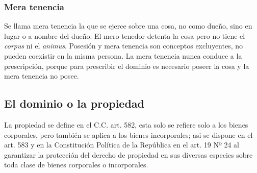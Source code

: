 \documentclass{templateNote}
\begin{document}
\subsubsection{Mera tenencia}
Se llama mera tenencia la que se ejerce sobre una cosa, no como dueño, sino en lugar o a nombre del dueño. El mero tenedor detenta la cosa pero no tiene el \textit{corpus} ni el \textit{animus}.
Posesión y mera tenencia son conceptos excluyentes, no pueden coexistir en la misma persona. 
La mera tenencia nunca conduce a la prescripción, porque para prescribir el dominio es necesario poseer la cosa y la mera tenencia no posee.

\subsection{El dominio o la propiedad}

La propiedad se define en el C.C. art. 582, esta solo se refiere solo a los bienes corporales, pero también se aplica a los bienes incorporales; asi se dispone en el art. 583 y en la Constitución Política de la República en el art. 19 Nº 24 al garantizar la protección del derecho de propiedad en sus diversas especies sobre toda clase de bienes corporales o incorporales.
\end{document}
